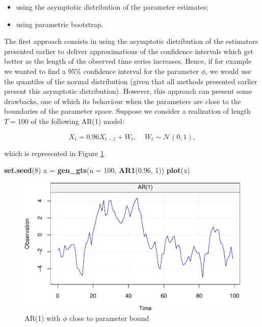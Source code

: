 \documentclass[]{book}
\newenvironment{Shaded}{\begin{snugshade}}{\end{snugshade}}
\newcommand{\DataTypeTok}[1]{\textcolor[rgb]{0.13,0.29,0.53}{#1}}
\newcommand{\DecValTok}[1]{\textcolor[rgb]{0.00,0.00,0.81}{#1}}
\newcommand{\FloatTok}[1]{\textcolor[rgb]{0.00,0.00,0.81}{#1}}
\newcommand{\KeywordTok}[1]{\textcolor[rgb]{0.13,0.29,0.53}{\textbf{#1}}}
\newcommand{\NormalTok}[1]{#1}
\newcommand{\StringTok}[1]{\textcolor[rgb]{0.31,0.60,0.02}{#1}}
\providecommand{\tightlist}{%
  \setlength{\itemsep}{0pt}\setlength{\parskip}{0pt}}
\theoremstyle{definition}
\theoremstyle{definition}
\theoremstyle{definition}
\theoremstyle{remark}
\begin{document}
\begin{itemize}
\tightlist
\item
  using the asymptotic distribution of the parameter estimates;
\item
  using parametric bootstrap.
\end{itemize}

The first approach consists in using the asymptotic distribution of the
estimators presented earlier to deliver approximations of the confidence
intervals which get better as the length of the observed time series
increases. Hence, if for example we wanted to find a 95\% confidence
interval for the parameter \(\phi\), we would use the quantiles of the
normal distribution (given that all methods presented earlier present
this asymptotic distribution). However, this approach can present some
drawbacks, one of which its behaviour when the parameters are close to
the boundaries of the parameter space. Suppose we consider a realization
of length \(T = 100\) of the following AR(1) model:

\[X_t = 0.96 X_{t-1} + W_t, \;\;\;\; W_t \sim \mathcal{N}(0,1),\]

which is represented in Figure \ref{fig:simAR1ci}

\begin{Shaded}
\begin{Highlighting}[]
\KeywordTok{set.seed}\NormalTok{(}\DecValTok{8}\NormalTok{)}
\NormalTok{x =}\StringTok{ }\KeywordTok{gen_gts}\NormalTok{(}\DataTypeTok{n =} \DecValTok{100}\NormalTok{, }\KeywordTok{AR1}\NormalTok{(}\FloatTok{0.96}\NormalTok{, }\DecValTok{1}\NormalTok{))}
\KeywordTok{plot}\NormalTok{(x)}
\end{Highlighting}
\end{Shaded}

\begin{figure}
\centering
\includegraphics{ts_files/figure-latex/simAR1ci-1.pdf}
\caption{\label{fig:simAR1ci}AR(1) with \(\phi\) close to parameter bound}
\end{figure}
\end{document}
